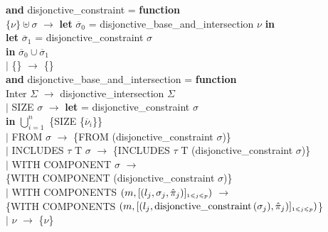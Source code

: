 \noindent
\textbf{and} disjonctive\_constraint  = \textbf{function} \\
\hspace*{1.2mm} $\{\nu\} \uplus \sigma$ $\rightarrow$ \textbf{let} $\overline\sigma_0$ = disjonctive\_base\_and\_intersection  $\nu$ \textbf{in} \\
\hspace*{22mm} \textbf{let} $\overline\sigma_1$ = disjonctive\_constraint  $\sigma$ \\
\hspace*{19mm} \textbf{in} $\overline\sigma_0 \cup \overline\sigma_1$ \\
$\mid$ \{\} $\rightarrow$ \{\} \\

\noindent
\textbf{and} disjonctive\_base\_and\_intersection  = \textbf{function} \\
\hspace*{1.2mm} \textsf{Inter} $\Sigma$ $\rightarrow$ disjonctive\_intersection $\Sigma$ \\
$\mid$ \textsf{SIZE} $\sigma$ $\rightarrow$ \textbf{let}  = disjonctive\_constraint  $\sigma$ \\
\hspace*{17mm} \textbf{in} $\bigcup_{i=1}^{n}$ \{\textsf{SIZE} \{$\overline\nu_i$\}\} \\
$\mid$ \textsf{FROM} $\sigma$ $\rightarrow$ \{\textsf{FROM} (disjonctive\_constraint  $\sigma$)\} \\
$\mid$ \textsf{INCLUDES} $\tau$ $\textrm{T}$ $\sigma$ $\rightarrow$ \{\textsf{INCLUDES} $\tau$ $\textrm{T}$ (disjonctive\_constraint  $\sigma$)\} \\
$\mid$ \textsf{WITH COMPONENT} $\sigma$ $\rightarrow$\\
\hspace*{5mm} \{\textsf{WITH COMPONENT} (disjonctive\_constraint
$\sigma$)\}\\
$\mid$ \textsf{WITH COMPONENTS} $(m, \mbox{[$(l_j, \sigma_j,  \hat\pi_j)$]$_{\scriptscriptstyle{1} \scriptscriptstyle{\leqslant} j \scriptscriptstyle{\leqslant} p}$})$ $\rightarrow$ \\
\{\textsf{WITH COMPONENTS} $(m, \mbox{[$(l_j, \textrm{disjonctive\_constraint} \, (\sigma_j),  \hat\pi_j)$]$_{\scriptscriptstyle{1} \scriptscriptstyle{\leqslant} j \scriptscriptstyle{\leqslant} p}$})$\} \\
$\mid$ $\nu$ $\rightarrow$ \{$\nu$\}
